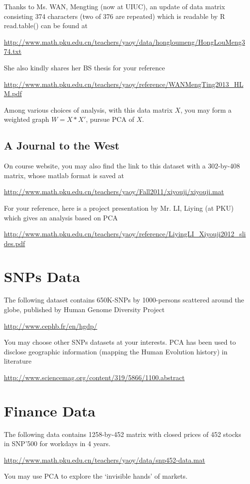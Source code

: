 \documentclass[11pt]{article}
\begin{document}
Thanks to Ms. WAN, Mengting (now at UIUC), an update of data matrix consisting 374 characters (two of 376 are repeated) which is readable by R read.table() can be found at 

\url{http://www.math.pku.edu.cn/teachers/yaoy/data/hongloumeng/HongLouMeng374.txt}

\noindent She also kindly shares her BS thesis for your reference
 
 \url{http://www.math.pku.edu.cn/teachers/yaoy/reference/WANMengTing2013_HLM.pdf}

Among various choices of analysis, with this data matrix $X$, you may form a weighted graph $W=X * X'$, pursue PCA of $X$. 

\subsection{A Journal to the West} On course website, you may also find the link to this dataset with a 302-by-408 matrix, whose matlab format is saved at

\url{http://www.math.pku.edu.cn/teachers/yaoy/Fall2011/xiyouji/xiyouji.mat}

For your reference, here is a project presentation by Mr. LI, Liying (at PKU) which gives an analysis based on PCA

\url{http://www.math.pku.edu.cn/teachers/yaoy/reference/LiyingLI_Xiyouji2012_slides.pdf}


\section{SNPs Data}

The following dataset contains 650K-SNPs by 1000-persons scattered around the globe, published by Human Genome Diversity Project

\url{http://www.cephb.fr/en/hgdp/}

You may choose other SNPs datasets at your interests. PCA has been used to disclose geographic information (mapping the Human Evolution history) in literature

\url{http://www.sciencemag.org/content/319/5866/1100.abstract}

\section{Finance Data}
The following data contains 1258-by-452 matrix with closed prices of 452 stocks in SNP'500 for workdays in 4 years.

\url{http://www.math.pku.edu.cn/teachers/yaoy/data/snp452-data.mat}

You may use PCA to explore the `invisible hands' of markets.
\end{document}
